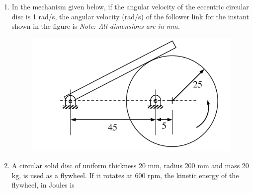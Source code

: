 \documentclass[journal,12pt,onecolumn]{IEEEtran}
\begin{document}
\begin{enumerate}
    \item In the mechanism given below, if the angular velocity of the eccentric circular disc is 1 rad/s, the angular velocity (rad/s) of the follower link for the instant shown in the figure is
          \textit{Note: All dimensions are in mm.}
          \begin{figure}[H]
              \centering
              \includegraphics[scale=0.2]{q20}
              \caption{}
              \label{q20}
          \end{figure}


          \begin{enumerate}
          \end{enumerate}

    \item A circular solid disc of uniform thickness 20 mm, radius 200 mm and mass 20 kg, is used as a flywheel. If it rotates at 600 rpm, the kinetic energy of the flywheel, in Joules is

          \begin{enumerate}
          \end{enumerate}


\end{enumerate}
\end{document}
